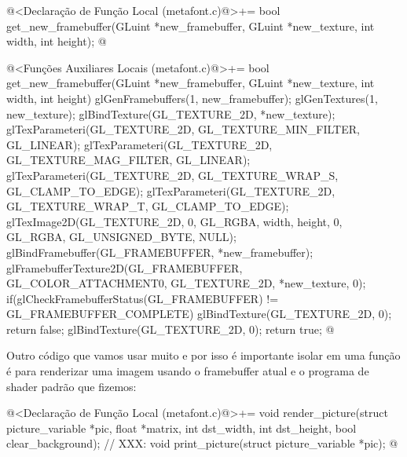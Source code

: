 {{{{{{\iniciocodigo
@<Declaração de Função Local (metafont.c)@>+=
bool get_new_framebuffer(GLuint *new_framebuffer, GLuint *new_texture,
                         int width, int height);
@
\fimcodigo

\iniciocodigo
@<Funções Auxiliares Locais (metafont.c)@>+=
bool get_new_framebuffer(GLuint *new_framebuffer, GLuint *new_texture,
                         int width, int height){
  glGenFramebuffers(1, new_framebuffer);
  glGenTextures(1, new_texture);
  glBindTexture(GL_TEXTURE_2D, *new_texture);
  glTexParameteri(GL_TEXTURE_2D, GL_TEXTURE_MIN_FILTER, GL_LINEAR);
  glTexParameteri(GL_TEXTURE_2D, GL_TEXTURE_MAG_FILTER, GL_LINEAR);
  glTexParameteri(GL_TEXTURE_2D, GL_TEXTURE_WRAP_S, GL_CLAMP_TO_EDGE);
  glTexParameteri(GL_TEXTURE_2D, GL_TEXTURE_WRAP_T, GL_CLAMP_TO_EDGE);
  glTexImage2D(GL_TEXTURE_2D, 0, GL_RGBA, width, height, 0, GL_RGBA,
               GL_UNSIGNED_BYTE, NULL);
  glBindFramebuffer(GL_FRAMEBUFFER, *new_framebuffer);
  glFramebufferTexture2D(GL_FRAMEBUFFER, GL_COLOR_ATTACHMENT0, GL_TEXTURE_2D,
                         *new_texture, 0);
  if(glCheckFramebufferStatus(GL_FRAMEBUFFER) != GL_FRAMEBUFFER_COMPLETE){
    glBindTexture(GL_TEXTURE_2D, 0);
    return false;
  }
  glBindTexture(GL_TEXTURE_2D, 0);
  return true;
}
@
\fimcodigo

Outro código que vamos usar muito e por isso é importante isolar em
uma função é para renderizar uma imagem usando o framebuffer atual e o
programa de shader padrão que fizemos:

\iniciocodigo
@<Declaração de Função Local (metafont.c)@>+=
void render_picture(struct picture_variable *pic, float *matrix, int dst_width,
                    int dst_height, bool clear_background);
// XXX:
void print_picture(struct picture_variable *pic);
@
\fimcodigo

}}}}}}
